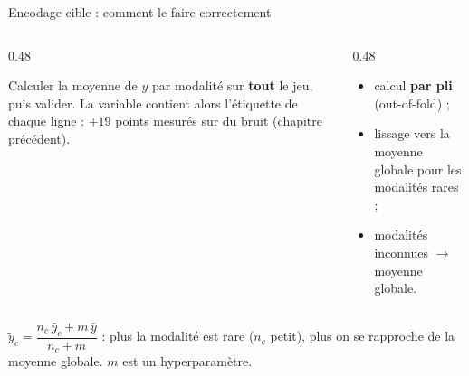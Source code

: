 \begin{frame}{Encodage cible : comment le faire correctement}
\begin{columns}[t]
\begin{column}{0.48\textwidth}
\begin{wbox}
Calculer la moyenne de $y$ par modalité sur \textbf{tout} le jeu, puis
valider. La variable contient alors l'étiquette de chaque ligne :
$+19$ points mesurés sur du bruit (chapitre précédent).
\end{wbox}
\end{column}
\begin{column}{0.48\textwidth}
\begin{solbox}
\begin{itemize}
  \item calcul \textbf{par pli} (out-of-fold) ;
  \item lissage vers la moyenne globale pour les modalités rares ;
  \item modalités inconnues $\rightarrow$ moyenne globale.
\end{itemize}
\end{solbox}
\end{column}
\end{columns}
\vspace{1.5mm}
\begin{kbox}
$\tilde y_c = \dfrac{n_c\,\bar y_c + m\,\bar y}{n_c + m}$ : plus la modalité est
rare ($n_c$ petit), plus on se rapproche de la moyenne globale. $m$ est un
hyperparamètre.
\end{kbox}
\end{frame}

